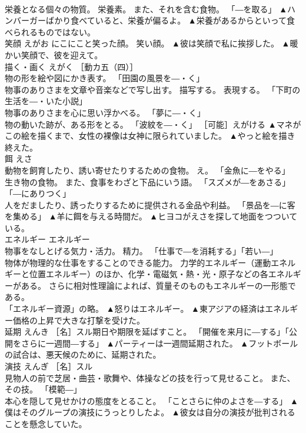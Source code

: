 \documentclass[8pt]{extreport}
\begin{document}
\begin{CJK}{UTF8}{min}
\\	栄養となる個々の物質。 栄養素。 また、それを含む食物。 「―を取る」	▲ハンバーガーばかり食べていると、栄養が偏るよ。 ▲栄養があるからといって食べられるものではない。
\\	笑顔	えがお	にこにこと笑った顔。 笑い顔。	▲彼は笑顔で私に挨拶した。 ▲暖かい笑顔で、彼を迎えて。
\\	描く・画く	えがく	［動カ五（四）］ 
\\	物の形を絵や図にかき表す。 「田園の風景を―・く」 
\\	物事のありさまを文章や音楽などで写し出す。 描写する。 表現する。 「下町の生活を―・いた小説」 
\\	物事のありさまを心に思い浮かべる。 「夢に―・く」 
\\	物の動いた跡が、ある形をとる。 「波紋を―・く」 ［可能］えがける	▲マネがこの絵を描くまで、女性の裸像は女神に限られていました。 ▲やっと絵を描き終えた。
\\	餌	えさ	
\\	動物を飼育したり、誘い寄せたりするための食物。 え。 「金魚に―をやる」 
\\	生き物の食物。 また、食事をわざと下品にいう語。 「スズメが―をあさる」「―にありつく」 
\\	人をだましたり、誘ったりするために提供される金品や利益。 「景品を―に客を集める」	▲羊に餌を与える時間だ。 ▲ヒヨコがえさを探して地面をつついている。
\\	エネルギー	エネルギー	
\\	物事をなしとげる気力・活力。 精力。 「仕事で―を消耗する」「若い―」 
\\	物体が物理的な仕事をすることのできる能力。 力学的エネルギー（運動エネルギーと位置エネルギー）のほか、化学・電磁気・熱・光・原子などの各エネルギーがある。 さらに相対性理論によれば、質量そのものもエネルギーの一形態である。 
\\	「エネルギー資源」の略。	▲怒りはエネルギー。 ▲東アジアの経済はエネルギー価格の上昇で大きな打撃を受けた。
\\	延期	えんき	［名］スル期日や期限を延ばすこと。 「開催を来月に―する」「公開をさらに一週間―する」	▲パーティーは一週間延期された。 ▲フットボールの試合は、悪天候のために、延期された。
\\	演技	えんぎ	［名］スル 
\\	見物人の前で芝居・曲芸・歌舞や、体操などの技を行って見せること。 また、その技。 「模範―」 
\\	本心を隠して見せかけの態度をとること。 「ことさらに仲のよさを―する」	▲僕はそのグループの演技にうっとりしたよ。 ▲彼女は自分の演技が批判されることを懸念していた。

\end{CJK}
\end{document}
